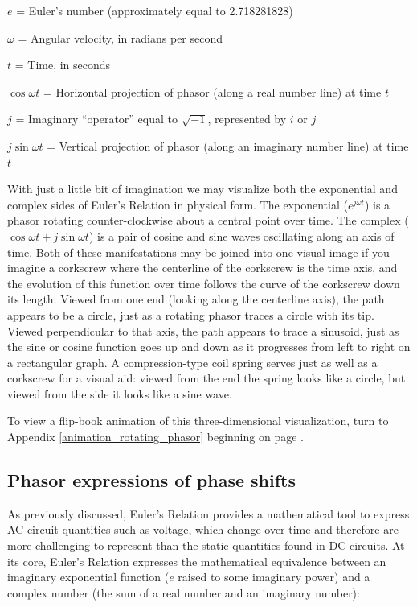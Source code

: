 $e$ = Euler's number (approximately equal to 2.718281828)

$\omega$ = Angular velocity, in radians per second

$t$ = Time, in seconds

$\cos \omega t$ = Horizontal projection of phasor (along a real number line) at time $t$

$j$ = Imaginary ``operator'' equal to $\sqrt{-1}$, represented by $i$ or $j$

$j \sin \omega t$ = Vertical projection of phasor (along an imaginary number line) at time $t$

\vskip 10pt

With just a little bit of imagination we may visualize both the exponential and complex sides of Euler's Relation in physical form.  The exponential ($e^{j \omega t}$) is a phasor rotating counter-clockwise about a central point over time.  The complex ($\cos \omega t + j \sin \omega t$) is a pair of cosine and sine waves oscillating along an axis of time.  Both of these manifestations may be joined into one visual image if you imagine a corkscrew where the centerline of the corkscrew is the time axis, and the evolution of this function over time follows the curve of the corkscrew down its length.  Viewed from one end (looking along the centerline axis), the path appears to be a circle, just as a rotating phasor traces a circle with its tip.  Viewed perpendicular to that axis, the path appears to trace a sinusoid, just as the sine or cosine function goes up and down as it progresses from left to right on a rectangular graph.  A compression-type coil spring serves just as well as a corkscrew for a visual aid: viewed from the end the spring looks like a circle, but viewed from the side it looks like a sine wave.

To view a flip-book animation of this three-dimensional visualization, turn to Appendix \ref{animation_rotating_phasor} beginning on page \pageref{animation_rotating_phasor}.









\filbreak
\subsection{Phasor expressions of phase shifts}

As previously discussed, Euler's Relation provides a mathematical tool to express AC circuit quantities such as voltage, which change over time and therefore are more challenging to represent than the static quantities found in DC circuits.  At its core, Euler's Relation expresses the mathematical equivalence between an imaginary exponential function ($e$ raised to some imaginary power) and a complex number (the sum of a real number and an imaginary number):  

